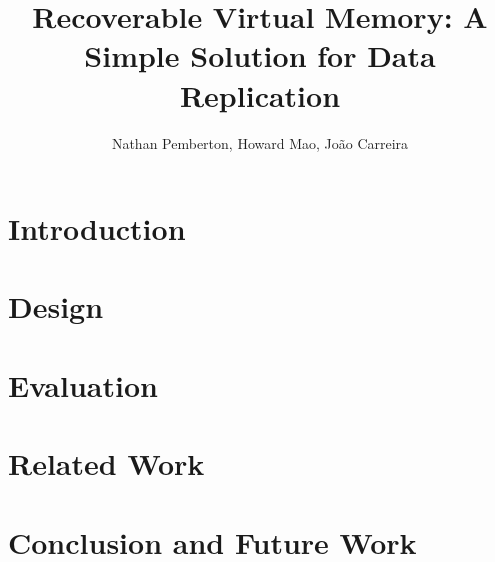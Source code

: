 \documentclass[10pt,twocolumn]{article}
\begin{document}
\title{{\bf Recoverable Virtual Memory: A Simple Solution for Data Replication}}
\author{
    Nathan Pemberton, Howard Mao, Jo\~{a}o Carreira
}
\maketitle

\begin{abstract}

\end{abstract}

\section{Introduction}

\section{Design}

\section{Evaluation}

\section{Related Work}


\section{Conclusion and Future Work}
\label{sec:conclusion}


{}

\end{document}
